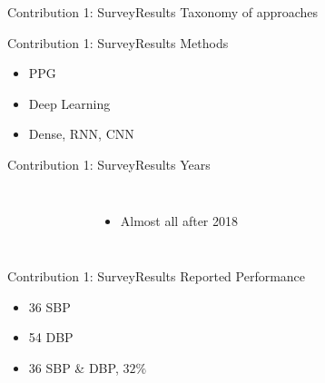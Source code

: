 \begin{frame}{Contribution 1: Survey}{Results}
    Taxonomy of approaches
    \begin{figure}
        
    \end{figure}
\end{frame}

\begin{frame}{Contribution 1: Survey}{Results}
    Methods
    \begin{figure}
        
        \hfill
        
        \hfill
        
    \end{figure}
    \begin{itemize}
        \item PPG
        \item Deep Learning
        \item Dense, RNN, CNN
    \end{itemize}
\end{frame}

\begin{frame}{Contribution 1: Survey}{Results}
    Years
    \begin{columns}
        \begin{figure}
            
        \end{figure}

        \begin{itemize}
            \item Almost all after 2018
        \end{itemize}
    \end{columns}


\end{frame}

\begin{frame}{Contribution 1: Survey}{Results}
    Reported Performance

    \begin{figure}
        
        
    \end{figure}

    \begin{itemize}
        \item 36 SBP
        \item 54 DBP
        \item 36 SBP \& DBP, $32\%$
    \end{itemize}
\end{frame}

